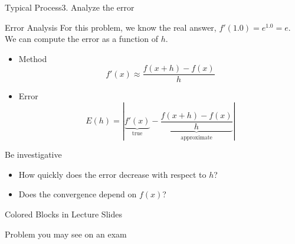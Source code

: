 \documentclass[10pt]{beamer}
\begin{document}
\begin{frame}{Typical Process}{3. Analyze the error}

    \begin{block}{Error Analysis}
        For this problem, we know the real answer, $f'(1.0) = e^{1.0} = e$. We can compute the error as a function of $h$. 
    \end{block}

 
    \begin{itemize}
    \item Method
  \begin{equation*} 
    f'(x) \approx \frac{f(x+h) - f(x)}{h}
    \end{equation*}

        \item Error 
        $$E(h) = \left| \underbrace{f'(x)}_{\text{true}} - \underbrace{\frac{f(x+h) - f(x)}{h}}_{\text{approximate}}\right|$$
    \end{itemize}

    \begin{block}{Be investigative}
    \begin{itemize}
        \item How quickly does the error decrease with respect to $h$?
        \item Does the convergence depend on $f(x)$?
    \end{itemize}
        
    \end{block}
\end{frame}


\begin{frame}[shrink]{Colored Blocks in Lecture Slides}
    
{
}

{
}

\begin{example}
Problem you may see on an exam
\end{example}



\end{frame}
\end{document}
